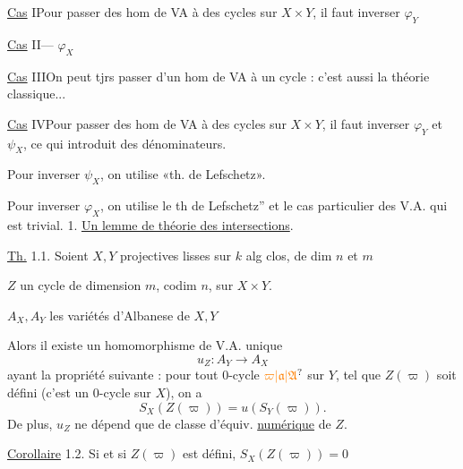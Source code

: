 \uline{Cas} I\quad Pour passer des hom de VA à des cycles sur $X\times Y$, il faut inverser $\varphi_Y$

\uline{Cas} II\quad {}\hfill --- $\varphi_X$

\uline{Cas} III\quad On peut tjrs passer d'un hom de VA à un cycle : c'est aussi la théorie classique...

\uline{Cas} IV\quad Pour passer des hom de VA à des cycles sur $X\times Y$, il faut inverser $\varphi_Y$ et $\psi_X$, ce qui introduit des dénominateurs.

Pour inverser $\psi_X$, on utilise «th. de Lefschetz». 

Pour inverser $\varphi_X$, on utilise le \unsure{\textquoteleft|\textquotedblleft|\guillemotleft{}}th de Lefschetz'' et le cas particulier des V.A. qui est trivial.
1. \uline{Un lemme de théorie des intersections}.

\uline{Th.} 1.1. Soient $X,Y$ projectives  lisses  sur $k$ alg clos, de dim $n$ et $m$

$Z$ un cycle de dimension $m$, codim $n$, sur $X\times Y$.

$A_X,A_Y$ les variétés d'Albanese  de $X,Y$

Alors il existe un homomorphisme de V.A. unique
\[
u_Z:A_Y\longrightarrow A_X
\]
ayant la propriété suivante : pour tout $0$-cycle $\unsure{\varpi|\mathfrak{a}|\mathfrak{A}}$ sur $Y$,  tel que $Z(\varpi)$ soit défini (c'est  un $0$-cycle sur $X$), on a
\[
S_X(Z(\varpi))=u(S_Y(\varpi)).
\]
De plus, $u_Z$ ne dépend que de classe d'équiv. \uline{numérique} de $Z$.

\uline{Corollaire} 1.2. Si  et si $Z(\varpi)$ est défini,  $S_X(Z(\varpi))=0$ 

